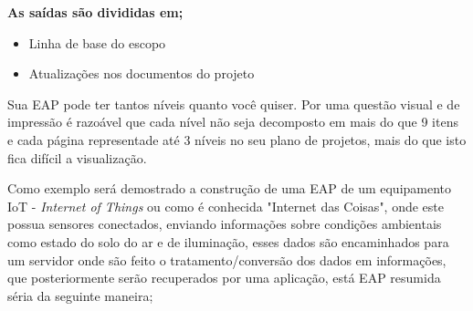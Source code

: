 \documentclass[12pt]{article}
\begin{document}
\textbf{As saídas são divididas em;}
	\begin{itemize}
			\begin{itemize}
		\item
		Linha de base do escopo
		
		\item
Atualizações nos documentos do projeto
		\end{itemize}
	\end{itemize}

Sua EAP pode ter tantos níveis quanto você quiser. Por uma questão visual e de impressão é razoável que cada nível não seja decomposto em mais do que 9 itens e cada página representade até 3 níveis no seu plano de projetos, mais do que isto fica difícil a visualização.

Como exemplo será demostrado a construção de uma EAP de um equipamento IoT - \textit{Internet of Things} ou como é conhecida "Internet das Coisas", onde este possua sensores conectados, enviando informações sobre condições ambientais como estado do solo do ar e de iluminação, esses dados são encaminhados para um servidor onde são feito o tratamento/conversão dos dados em informações, que posteriormente serão recuperados por uma aplicação, está EAP resumida séria da seguinte maneira;

\vspace{10}
\end{document}
